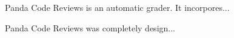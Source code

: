 



Panda Code Reviews is an automatic grader. It incorpores...

Panda Code Reviews was completely design...